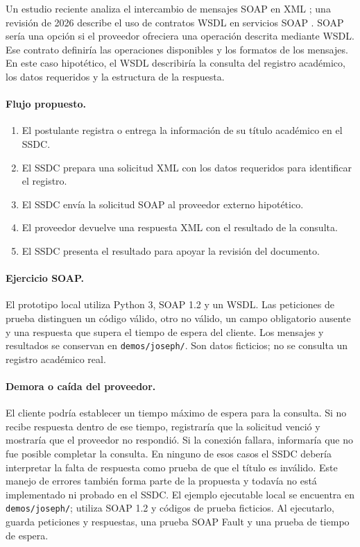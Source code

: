 \documentclass[10pt,a4paper,twocolumn]{article}
\begin{document}
Un estudio reciente analiza el intercambio de mensajes SOAP en XML
\cite{ayfan2024soap}; una revisión de 2026 describe el uso de contratos WSDL
en servicios SOAP \cite{kannan-soap-rest-2026}. SOAP sería una opción si
el proveedor ofreciera una operación descrita mediante WSDL. Ese contrato definiría las operaciones disponibles y los
formatos de los mensajes. En este caso hipotético, el WSDL describiría la
consulta del registro académico, los datos requeridos y la estructura de la
respuesta.

\paragraph{Flujo propuesto.}
\begin{enumerate}
    \item El postulante registra o entrega la información de su título
          académico en el SSDC.
    \item El SSDC prepara una solicitud XML con los datos requeridos para
          identificar el registro.
    \item El SSDC envía la solicitud SOAP al proveedor externo hipotético.
    \item El proveedor devuelve una respuesta XML con el resultado de la
          consulta.
    \item El SSDC presenta el resultado para apoyar la revisión del documento.
\end{enumerate}

\paragraph{Ejercicio SOAP.}
El prototipo local utiliza Python 3, SOAP 1.2 y un WSDL. Las peticiones
de prueba distinguen un código válido, otro no válido, un campo obligatorio
ausente y una respuesta que supera el tiempo de espera del cliente.
Los mensajes y resultados se conservan en \texttt{demos/joseph/}.
Son datos ficticios; no se consulta un registro académico real.

\paragraph{Demora o caída del proveedor.}
El cliente podría establecer un tiempo máximo de espera para la consulta.
Si no recibe respuesta dentro de ese tiempo, registraría que la solicitud
venció y mostraría que el proveedor no respondió. Si la conexión fallara,
informaría que no fue posible completar la consulta. En ninguno de esos
casos el SSDC debería interpretar la falta de respuesta como prueba de que
el título es inválido. Este manejo de errores también forma parte de la
propuesta y todavía no está implementado ni probado en el SSDC. El ejemplo ejecutable
local se encuentra en \texttt{demos/joseph/}; utiliza SOAP 1.2 y códigos
de prueba ficticios. Al ejecutarlo, guarda peticiones y respuestas,
una prueba SOAP Fault y una prueba de tiempo de espera.
\end{document}
